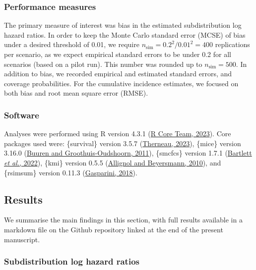 \documentclass[
  letterpaper,
  DIV=11,
  numbers=noendperiod]{scrreprt}
\begin{document}
\hypertarget{performance-measures-1}{%
\subsubsection{Performance measures}\label{performance-measures-1}}

The primary measure of interest was bias in the estimated
subdistribution log hazard ratios. In order to keep the Monte Carlo
standard error (MCSE) of bias under a desired threshold of 0.01, we
require \(n_{\text{sim}} = 0.2^2/0.01^2 = 400\) replications per
scenario, as we expect empirical standard errors to be under 0.2 for all
scenarios (based on a pilot run). This number was rounded up to
\(n_{\text{sim}} = 500\). In addition to bias, we recorded empirical and
estimated standard errors, and coverage probabilities. For the
cumulative incidence estimates, we focused on both bias and root mean
square error (RMSE).

\hypertarget{software-1}{%
\subsubsection{Software}\label{software-1}}

Analyses were performed using R version 4.3.1
(\protect\hyperlink{ref-rcoreteamLanguageEnvironmentStatistical2023}{R
Core Team, 2023}). Core packages used were: \{survival\} version 3.5.7
(\protect\hyperlink{ref-survival-package}{Therneau, 2023}), \{mice\}
version 3.16.0
(\protect\hyperlink{ref-buurenMiceMultivariateImputation2011}{Buuren and
Groothuis-Oudshoorn, 2011}), \{smcfcs\} version 1.7.1
(\protect\hyperlink{ref-bartlettSmcfcsMultipleImputation2022}{Bartlett
\emph{et al.}, 2022}), \{kmi\} version 0.5.5
(\protect\hyperlink{ref-allignolSoftwareFittingNonstandard2010}{Allignol
and Beyersmann, 2010}), and \{rsimsum\} version 0.11.3
(\protect\hyperlink{ref-gaspariniRsimsumSummariseResults2018}{Gasparini,
2018}).

\hypertarget{results-2}{%
\subsection{Results}\label{results-2}}

We summarise the main findings in this section, with full results
available in a markdown file on the Github repository linked at the end
of the present manuscript.

\hypertarget{subdistribution-log-hazard-ratios}{%
\subsubsection{Subdistribution log hazard
ratios}\label{subdistribution-log-hazard-ratios}}
\end{document}
